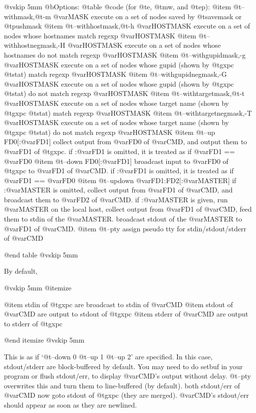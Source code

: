 @vskip 5mm
@b{Options: }
@table @code
(for @t{e}, @t{mw}, and @t{ep}):
@item   @t{--withmask},@t{-m} @var{MASK}
    execute on a set of nodes saved by @t{savemask} or @t{pushmask}
@item   @t{--withhostmask},@t{-h} @var{HOSTMASK}
    execute on a set of nodes whose hostnames match regexp @var{HOSTMASK}
@item   @t{--withhostnegmask},-H @var{HOSTMASK}
    execute on a set of nodes whose hostnames do not match regexp @var{HOSTMASK}
@item   @t{--withgupidmask},-g @var{HOSTMASK}
    execute on a set of nodes whose gupid (shown by @t{gxpc} @t{stat}) 
    match regexp @var{HOSTMASK}
@item   @t{--withgupidnegmask},-G @var{HOSTMASK}
    execute on a set of nodes whose gupid (shown by @t{gxpc} @t{stat}) 
    do not match regexp @var{HOSTMASK}
@item   @t{--withtargetmask},@t{-t} @var{HOSTMASK}
    execute on a set of nodes whose target name (shown by @t{gxpc} @t{stat}) 
    match regexp @var{HOSTMASK}
@item   @t{--withtargetnegmask},-T @var{HOSTMASK}
    execute on a set of nodes whose target name (shown by @t{gxpc} @t{stat}) 
    do not match regexp @var{HOSTMASK}
@item   @t{--up} FD0[:@var{FD1}]
    collect output from @var{FD0} of @var{CMD}, and output them to @var{FD1} of @t{gxpc}.
    if :@var{FD1} is omitted, it is treated as if @var{FD1} == @var{FD0}
@item   @t{--down} FD0[:@var{FD1}]
    broadcast input to @var{FD0} of @t{gxpc} to @var{FD1} of @var{CMD}.
    if :@var{FD1} is omitted, it is treated as if @var{FD1} == @var{FD0}
@item   @t{--updown} @var{FD1}:FD2[:@var{MASTER}]
    if :@var{MASTER} is omitted, collect output from @var{FD1} of @var{CMD},
    and broadcast them to @var{FD2} of @var{CMD}.
    if :@var{MASTER} is given, run @var{MASTER} on the local host, collect
    output from @var{FD1} of @var{CMD}, feed them to stdin of the @var{MASTER}.
    broadcast stdout of the @var{MASTER} to @var{FD1} of @var{CMD}.
@item   @t{--pty}
    assign pseudo tty for stdin/stdout/stderr of @var{CMD}

@end table
@vskip 5mm

By default,

@vskip 5mm
@itemize

@item  stdin of @t{gxpc} are broadcast to stdin of @var{CMD}
@item  stdout of @var{CMD} are output to stdout of @t{gxpc}
@item  stderr of @var{CMD} are output to stderr of @t{gxpc}

@end itemize
@vskip 5mm

This is as if `@t{--down} 0 @t{--up} 1 @t{--up} 2' are specified.  In this
case, stdout/stderr are block-buffered by default.  You may need
to do setbuf in your program or flush stdout/err, to display
@var{CMD}'s output without delay.  @t{--pty} overwrites this and turn them
to line-buffered (by default).  both stdout/err of @var{CMD} now goto
stdout of @t{gxpc} (they are merged).  @var{CMD}'s stdout/err should appear
as soon as they are newlined.

